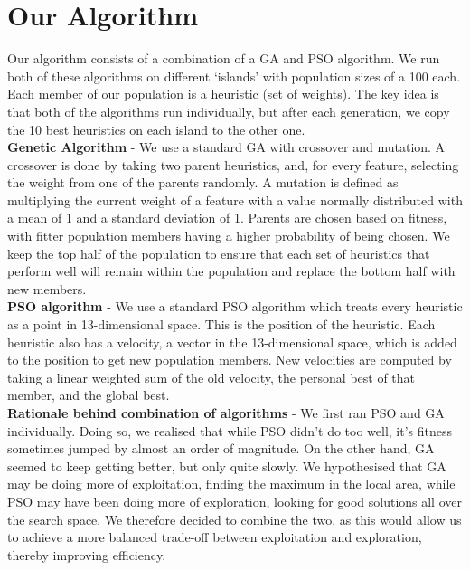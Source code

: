 \documentclass[12pt]{article}
\begin{document}
	\vspace{-0.3cm}
    \section{Our Algorithm}
	\vspace{-0.2cm}

    Our algorithm consists of a combination of a GA and PSO algorithm. We run both of these algorithms on different ‘islands’
	with population sizes of a 100 each. Each member of our population is a heuristic (set of weights).
	The key idea is that both of the algorithms run individually, but after each generation, we
	copy the 10 best heuristics on each island to the other one.\\

	\textbf{Genetic Algorithm} -
	We use a standard GA with crossover and mutation. A crossover is
	done by taking two parent heuristics, and,
	for every feature, selecting the weight from one of the parents randomly. A
	mutation is defined as multiplying the current weight of a feature with
	a value normally distributed with a mean of 1 and a standard deviation of 1. Parents are chosen based on fitness, with fitter population members having a higher
	probability of being chosen. We keep the top half of the population to ensure that each set of heuristics
	that perform well will remain within the population and replace the bottom half with
	new members.\\

	\textbf{PSO algorithm} -
	We use a standard PSO algorithm which treats every heuristic as a point in 13-dimensional space.
	This is the position of the heuristic. Each heuristic also has a velocity,
	a vector in the 13-dimensional space, which is added to the position to get
	new population members. New velocities are computed by taking a linear weighted
	sum of the old velocity, the personal best of that member, and the global best.\\

	\textbf{Rationale behind combination of algorithms} -
	We first ran PSO and GA individually. Doing so, we realised that while PSO didn't do too well,
	it's fitness sometimes jumped by almost an order of magnitude.
	On the other hand, GA seemed to keep getting
	better, but only quite slowly. We hypothesised
	that GA may be doing more of exploitation, finding the maximum in the local area,
	while PSO may have been doing more of exploration, looking for good solutions all over
	the search space. We therefore decided to combine the two, as this
	would allow us to achieve a more balanced trade-off between exploitation
	and exploration, thereby improving efficiency.
\end{document}
